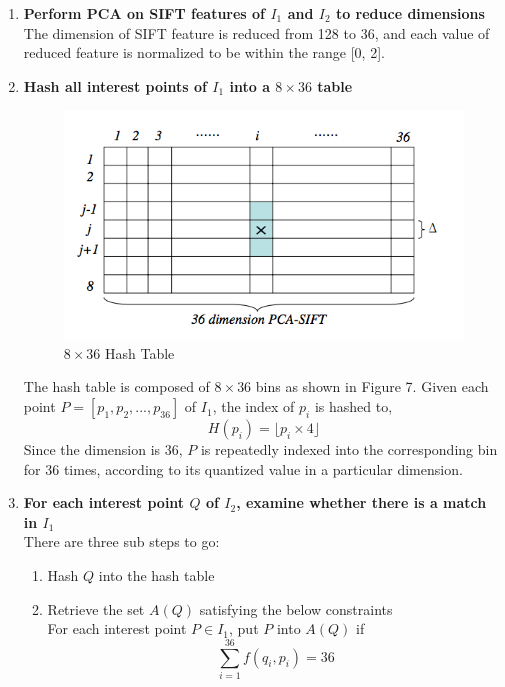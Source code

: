 \begin{enumerate}
  \item{\bfseries Perform PCA on SIFT features of $I_1$ and $I_2$ to reduce dimensions}
  The dimension of SIFT feature is reduced from 128 to 36, and each value of reduced feature is normalized to be within the range [0, 2]. 

  \item{\bfseries Hash all interest points of $I_1$ into a $8 \times 36$ table}

  \begin{figure}[!ht]
  \centering
    \includegraphics[scale = 0.8]{./hashTable.png}
  \caption{$8 \times 36$ Hash Table \cite{zhao2007near}}
  \end{figure}
  
  The hash table is composed of $8 \times 36$ bins as shown in Figure 7. Given each point $P = [p_1, p_2,..., p_{36}]$ of $I_1$, the index of $p_i$ is hashed to, 
  $$H(p_i) = \lfloor p_i \times 4 \rfloor$$ 
  Since the dimension is 36, $P$ is repeatedly indexed into the corresponding bin for 36 times, according to its quantized value in a particular dimension.   
  
  \item{\bfseries For each interest point $Q$ of $I_2$, examine whether there is a match in $I_1$}\\
  There are three sub steps to go:
    
    \begin{enumerate}
    \item {Hash $Q$ into the hash table}
    \item {Retrieve the set $A(Q)$ satisfying the below constraints}\\
    For each interest point $P \in I_1$, put $P$ into $A(Q)$ if $$\sum_{i=1}^{36}f(q_i, p_i) = 36$$ 


\end{enumerate}
\end{enumerate}
